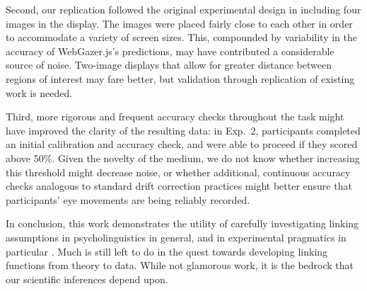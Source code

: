 \documentclass[10pt,letterpaper]{article}
\begin{document}
Second, our replication followed the original experimental design in including four images in the display. The images were placed fairly close to each other in order to accommodate a variety of screen sizes. This, compounded by variability in the accuracy of WebGazer.js's predictions, may have contributed a considerable source of noise. Two-image displays that allow for greater distance between regions of interest may fare better, but validation through replication of existing work is needed. 

Third, more rigorous and frequent accuracy checks throughout the task might have improved the clarity of the resulting data: in Exp.~2, participants completed an initial calibration and accuracy check, and were able to proceed if they scored above 50\%. Given the novelty of the medium, we do not know whether increasing this threshold might decrease noise, or whether additional, continuous accuracy checks analogous to standard drift correction practices might better ensure that participants' eye movements are being reliably recorded.


In conclusion, this work demonstrates the utility of carefully investigating linking assumptions in psycholinguistics in general, and in experimental pragmatics in particular \cite<see also>{franke2016link,WaldonDegen2020}. Much is still left to do in the quest towards developing linking functions from theory to data. While not glamorous work, it is the bedrock that our scientific inferences depend upon.

%
		
\end{document}
